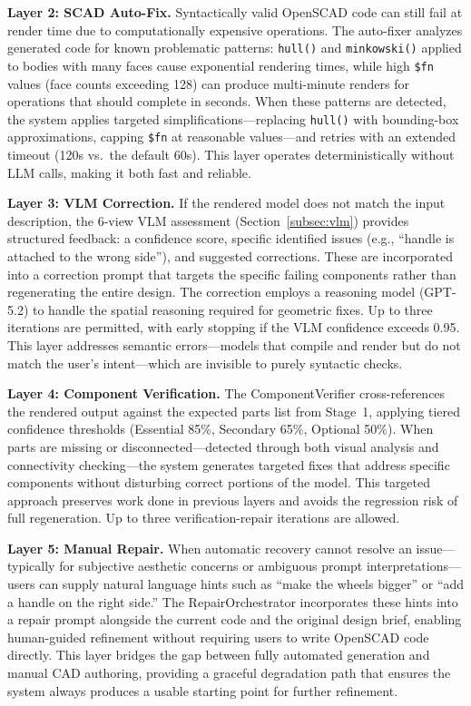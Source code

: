 \documentclass[5p,twocolumn,10pt,times]{elsarticle}
\begin{document}
\textbf{Layer 2: SCAD Auto-Fix.} Syntactically valid OpenSCAD code can still fail at render time due to computationally expensive operations. The auto-fixer analyzes generated code for known problematic patterns: \texttt{hull()} and \texttt{minkowski()} applied to bodies with many faces cause exponential rendering times, while high \texttt{\$fn} values (face counts exceeding 128) can produce multi-minute renders for operations that should complete in seconds. When these patterns are detected, the system applies targeted simplifications---replacing \texttt{hull()} with bounding-box approximations, capping \texttt{\$fn} at reasonable values---and retries with an extended timeout (120s vs.\ the default 60s). This layer operates deterministically without LLM calls, making it both fast and reliable.

\textbf{Layer 3: VLM Correction.} If the rendered model does not match the input description, the 6-view VLM assessment (Section~\ref{subsec:vlm}) provides structured feedback: a confidence score, specific identified issues (e.g., ``handle is attached to the wrong side''), and suggested corrections. These are incorporated into a correction prompt that targets the specific failing components rather than regenerating the entire design. The correction employs a reasoning model (GPT-5.2) to handle the spatial reasoning required for geometric fixes. Up to three iterations are permitted, with early stopping if the VLM confidence exceeds 0.95. This layer addresses semantic errors---models that compile and render but do not match the user's intent---which are invisible to purely syntactic checks.

\textbf{Layer 4: Component Verification.} The ComponentVerifier cross-references the rendered output against the expected parts list from Stage~1, applying tiered confidence thresholds (Essential 85\%, Secondary 65\%, Optional 50\%). When parts are missing or disconnected---detected through both visual analysis and connectivity checking---the system generates targeted fixes that address specific components without disturbing correct portions of the model. This targeted approach preserves work done in previous layers and avoids the regression risk of full regeneration. Up to three verification-repair iterations are allowed.

\textbf{Layer 5: Manual Repair.} When automatic recovery cannot resolve an issue---typically for subjective aesthetic concerns or ambiguous prompt interpretations---users can supply natural language hints such as ``make the wheels bigger'' or ``add a handle on the right side.'' The RepairOrchestrator incorporates these hints into a repair prompt alongside the current code and the original design brief, enabling human-guided refinement without requiring users to write OpenSCAD code directly. This layer bridges the gap between fully automated generation and manual CAD authoring, providing a graceful degradation path that ensures the system always produces a usable starting point for further refinement.
\end{document}

